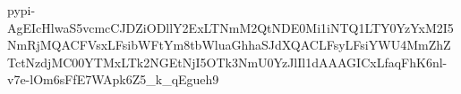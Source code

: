 pypi-AgEIcHlwaS5vcmcCJDZiODllY2ExLTNmM2QtNDE0Mi1iNTQ1LTY0YzYxM2I5NmRjMQACFVsxLFsibWFtYm8tbWluaGhhaSJdXQACLFsyLFsiYWU4MmZhZTctNzdjMC00YTMxLTk2NGEtNjI5OTk3NmU0YzJlIl1dAAAGICxLfaqFhK6nl-v7e-lOm6sFfE7WApk6Z5_k_qEgueh9